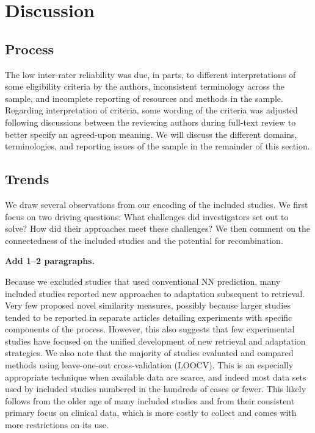 \documentclass[preprint, 3p,
authoryear]{elsarticle} %
\begin{document}
\hypertarget{discussion}{%
\section{Discussion}\label{discussion}}

\hypertarget{process}{%
\subsection{Process}\label{process}}

The low inter-rater reliability was due, in parts, to different
interpretations of some eligibility criteria by the authors,
inconsistent terminology across the sample, and incomplete reporting of
resources and methods in the sample. Regarding interpretation of
criteria, some wording of the criteria was adjusted following
discussions between the reviewing authors during full-text review to
better specify an agreed-upon meaning. We will discuss the different
domains, terminologies, and reporting issues of the sample in the
remainder of this section.

\hypertarget{trends}{%
\subsection{Trends}\label{trends}}

We draw several observations from our encoding of the included studies.
We first focus on two driving questions: What challenges did
investigators set out to solve? How did their approaches meet these
challenges? We then comment on the connectedness of the included studies
and the potential for recombination.

\textbf{Add 1--2 paragraphs.}

Because we excluded studies that used conventional NN prediction, many
included studies reported new approaches to adaptation subsequent to
retrieval. Very few proposed novel similarity measures, possibly because
larger studies tended to be reported in separate articles detailing
experiments with specific components of the process. However, this also
suggests that few experimental studies have focused on the unified
development of new retrieval and adaptation strategies. We also note
that the majority of studies evaluated and compared methods using
leave-one-out cross-validation (LOOCV). This is an especially
appropriate technique when available data are scarce, and indeed most
data sets used by included studies numbered in the hundreds of cases or
fewer. This likely follows from the older age of many included studies
and from their consistent primary focus on clinical data, which is more
costly to collect and comes with more restrictions on its use.
\end{document}
